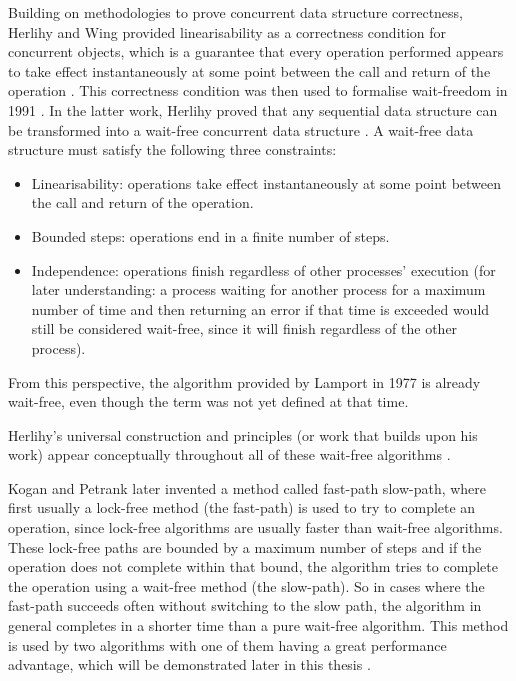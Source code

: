 Building on methodologies to prove concurrent data structure correctness, Herlihy and Wing provided linearisability as a correctness condition for concurrent objects, which is a guarantee that every operation performed appears to take effect instantaneously at some point between the call and return of the operation \cite{HerlihyLinearizability}. This correctness condition was then used to formalise wait-freedom in 1991 \cite{herlihy1991wait}. In the latter work, Herlihy proved that any sequential data structure can be transformed into a wait-free concurrent data structure \cite{herlihy1991wait}. A wait-free data structure must satisfy the following three constraints: 
\begin{itemize}
   \item Linearisability: operations take effect instantaneously at some point between the call and return of the operation.
   \item Bounded steps: operations end in a finite number of steps.
   \item Independence: operations finish regardless of other processes' execution (for later understanding: a process waiting for another process for a maximum number of time and then returning an error if that time is exceeded would still be considered wait-free, since it will finish regardless of the other process).
\end{itemize}
From this perspective, the algorithm provided by Lamport in 1977 is already wait-free, even though the term was not yet defined at that time. \cite{herlihy1991wait,HerlihyLinearizability}

Herlihy's universal construction and principles (or work that builds upon his work) appear conceptually throughout all of these wait-free algorithms \cite{Kogan2011WaitFreeQueues,FeldmanDechev2015WaitFreeRingBuffer,kogan2012methodology,FeldmanDechevV2,FeldmanDechevV3,RamalheteQueue,wCQWaitFreeQueue,Verma2013Scalable,FastFetchAndAddWaitFreeQueue,WangCacheCoherent,adampsc,jiffy,JayantiLog,Drescher2015GuardedSections,Mateíspmc,torquati2010singleproducersingleconsumerqueuessharedcache,Aldinucci2012EfficientSync,Wang2013BQueue,MaffioneCacheAware,ffq}. \cite{herlihy1991wait}

Kogan and Petrank later invented a method called fast-path slow-path, where first usually a lock-free method (the fast-path) is used to try to complete an operation, since lock-free algorithms are usually faster than wait-free algorithms. These lock-free paths are bounded by a maximum number of steps and if the operation does not complete within that bound, the algorithm tries to complete the operation using a wait-free method (the slow-path). So in cases where the fast-path succeeds often without switching to the slow path, the algorithm in general completes in a shorter time than a pure wait-free algorithm. This method is used by two algorithms with one of them having a great performance advantage, which will be demonstrated later in this thesis \cite{wCQWaitFreeQueue,FastFetchAndAddWaitFreeQueue}. \cite{kogan2012methodology}